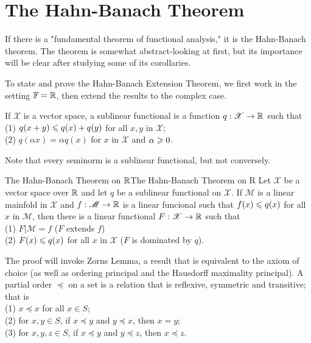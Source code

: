 \chapter{The Hahn-Banach Theorem}\label{chp:3_6}

If there is a "fundamental theorem of functional analysis," it is the Hahn-Banach
theorem. The theorem is somewhat abstract-looking at first, but its importance will be
clear after studying some of its corollaries.

To state and prove the Hahn-Banach
Extension Theorem, we first work in the setting
$\mathbb{F}=\mathbb{R}$, then extend the results to the
complex case.

\begin{definition}{}{}
    If $\mathscr{X}$ is a vector space, 
    a sublinear functional is a function $q:\mathscr{X}\rightarrow \mathbb{R}$ such that\\
    (1) $q(x+y)\leqslant q(x)+q(y)$ for all $x,y$ in $\mathscr{X}$;\\
    (2) $q(\alpha x)=\alpha q(x)$ for $x$ in $\mathscr{X}$ and $\alpha\geqslant 0$. 
\end{definition}
\begin{remark}
    Note that every seminorm is a sublinear functional, but not conversely.    
\end{remark}

\begin{theorem}{The Hahn-Banach Theorem on $\mathbb{R}$}{The Hahn-Banach Theorem on R}
        Let $\mathscr{X}$ be a vector space over $\mathbb{R}$ and let $q$ be a sublinear functional on $\mathscr{X}$.
        If $\mathscr{M}$ is a linear mainfold in $\mathscr{X}$ and $f:\mathscr{M}\rightarrow \mathbb{R}$ is a linear funcional
        such that $f(x)\leqslant q(x)$ for all $x$ in $\mathscr{M}$, 
        then there is a linear functional $F:\mathscr{X}\rightarrow \mathbb{R}$ 
        such that \\
        (1) $F|\mathscr{M}=f$ ($F$ extends $f$)\\
        (2) $F(x)\leqslant q(x)$ for all $x$ in $\mathscr{X}$ ($F$ is dominated by $q$).
\end{theorem}

The proof will invoke Zorns Lemma,
a result that is equivalent to the axiom of choice (as well as ordering principal and the Hausdorff maximality principal).
A partial order $\preceq$ on a set is a relation that is reflexive, symmetric and transitive; that is\\
(1) $x\preceq x$ for all $x\in S$;\\
(2) for $x,y\in S$, if $x\preceq y$ and $y\preceq x$, then $x=y$;\\
(3) for $x,y,z\in S$, if $x\preceq y$ and $y\preceq z$, then $x\preceq z$.


